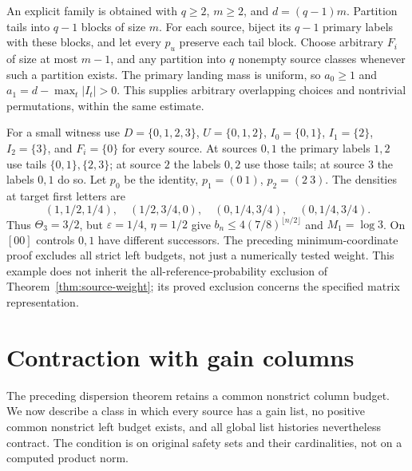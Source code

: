 \documentclass[11pt,reqno]{amsart}
\numberwithin{equation}{section}
\theoremstyle{definition}
\newcommand{\eps}{\varepsilon}
\begin{document}
An explicit family is obtained with $q\ge2$, $m\ge2$, and
$d=(q-1)m$. Partition tails into $q-1$ blocks of size $m$.
For each source, biject its $q-1$ primary labels with these blocks,
and let every $p_u$ preserve each tail block. Choose arbitrary
$F_i$ of size at most $m-1$, and any partition into $q$ nonempty
source classes whenever such a partition exists. The primary
landing mass is uniform, so $a_0\ge1$ and
$a_1=d-\max_t|I_t|>0$. This supplies arbitrary overlapping
choices and nontrivial permutations, within the same estimate.

For a small witness use $D=\{0,1,2,3\}$, $U=\{0,1,2\}$,
$I_0=\{0,1\}$, $I_1=\{2\}$, $I_2=\{3\}$, and
$F_i=\{0\}$ for every source. At sources $0,1$ the primary
labels $1,2$ use tails $\{0,1\},\{2,3\}$; at source $2$ the
labels $0,2$ use those tails; at source $3$ the labels $0,1$ do so.
Let $p_0$ be the identity, $p_1=(0\ 1)$, $p_2=(2\ 3)$.
The densities at target first letters are
\[
 (1,1/2,1/4),\quad(1/2,3/4,0),\quad
 (0,1/4,3/4),\quad(0,1/4,3/4).
\]
Thus $\Theta_3=3/2$, but $\eps=1/4$, $\eta=1/2$ give
$b_n\le4(7/8)^{\lfloor n/2\rfloor}$ and $M_1=\log3$.
On $[00]$ controls $0,1$ have different successors. The preceding
minimum-coordinate proof excludes all strict left budgets, not
just a numerically tested weight. This example does not inherit
the all-reference-probability exclusion of
Theorem~\ref{thm:source-weight}; its proved exclusion concerns
the specified matrix representation.


\section{Contraction with gain columns}
\label{sec:gainloss}

The preceding dispersion theorem retains a common nonstrict column
budget. We now describe a class in which every source has a gain
list, no positive common nonstrict left budget exists, and all global
list histories nevertheless contract. The condition is on original
safety sets and their cardinalities, not on a computed product norm.
\end{document}

